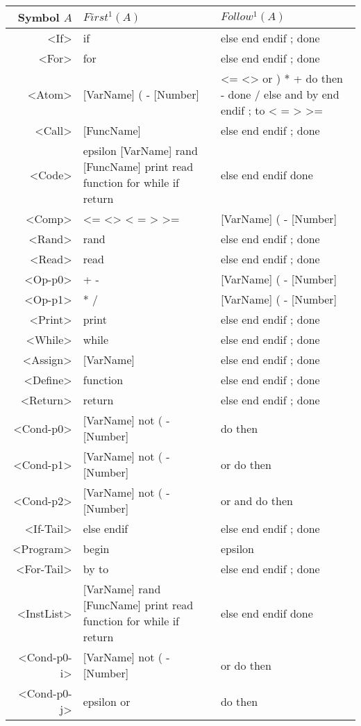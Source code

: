 \begin{longtable}{r p{7cm} p{7cm}}
\textnormal{Symbol} $A$ & $First^1(A)$ & $Follow^1(A)$\\ \hline
<If> & if  & else end endif ; done \\ \hline
<For> & for  & else end endif ; done \\ \hline
<Atom> & [VarName] ( - [Number]  & <= <> or ) * + do then - done / else and by end endif ; to < = > >= \\ \hline
<Call> & [FuncName]  & else end endif ; done \\ \hline
<Code> & epsilon [VarName] rand [FuncName] print read function for while if return  & else end endif done \\ \hline
<Comp> & <= <> < = > >=  & [VarName] ( - [Number] \\ \hline
<Rand> & rand  & else end endif ; done \\ \hline
<Read> & read  & else end endif ; done \\ \hline
<Op-p0> & + -  & [VarName] ( - [Number] \\ \hline
<Op-p1> & * /  & [VarName] ( - [Number] \\ \hline
<Print> & print  & else end endif ; done \\ \hline
<While> & while  & else end endif ; done \\ \hline
<Assign> & [VarName]  & else end endif ; done \\ \hline
<Define> & function  & else end endif ; done \\ \hline
<Return> & return  & else end endif ; done \\ \hline
<Cond-p0> & [VarName] not ( - [Number]  & do then \\ \hline
<Cond-p1> & [VarName] not ( - [Number]  & or do then \\ \hline
<Cond-p2> & [VarName] not ( - [Number]  & or and do then \\ \hline
<If-Tail> & else endif  & else end endif ; done \\ \hline
<Program> & begin  & epsilon \\ \hline
<For-Tail> & by to  & else end endif ; done \\ \hline
<InstList> & [VarName] rand [FuncName] print read function for while if return  & else end endif done \\ \hline
<Cond-p0-i> & [VarName] not ( - [Number]  & or do then \\ \hline
<Cond-p0-j> & epsilon or  & do then \\ \hline

\end{longtable}
